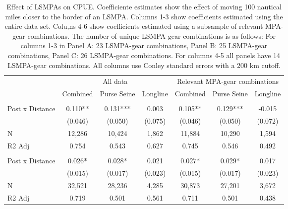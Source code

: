 \begin{table}

\caption{\label{tab:cont_treat}Effect of LSMPAs on CPUE. Coefficiente estimates show the
             effect of moving 100 nautical miles closer to the border of an LSMPA.
             Columns 1-3 show coefficients estimated using the entire data set.
             Colu,ns 4-6 show coefficients estimated using a subsample of relevant
             MPA-gear combinations. The number of unique LSMPA-gear combinations
             is as follows: For columns 1-3 in Panel A: 23 LSMPA-gear combinations,
             Panel B: 25 LSMPA-gear combinations, Panel C: 26 LSMPA-gear combinations.
             For columns 4-5 all panels have 14 LSMPA-gear combinations. All
             columns use Conley standard errors with a 200 km cutoff.}
\centering
\begin{tabular}[t]{lcccccc}
\toprule
\multicolumn{1}{c}{ } & \multicolumn{3}{c}{All data} & \multicolumn{3}{c}{Relevant MPA-gear combinations} \\
\cmidrule(l{3pt}r{3pt}){2-4} \cmidrule(l{3pt}r{3pt}){5-7}
 & Combined & Purse Seine & Longline & Combined & Purse Seine & Longline\\
\midrule
\addlinespace[0.3em]
\multicolumn{7}{l}{Panel A: 0-200 nautical miles}\\
\hline
\hspace{1em}Post x Distance & 0.110** & 0.131*** & 0.003 & 0.105** & 0.129*** & -0.015\\
\hspace{1em} & (0.046) & (0.050) & (0.075) & (0.046) & (0.050) & (0.072)\\
\hspace{1em}N & 12,286 & 10,424 & 1,862 & 11,884 & 10,290 & 1,594\\
\hspace{1em}R2 Adj & 0.754 & 0.543 & 0.627 & 0.745 & 0.546 & 0.492\\
\addlinespace[0.5cm]
\multicolumn{7}{l}{Panel B: 0-400 nautical miles}\\
\hline
\hspace{1em}Post x Distance & 0.026* & 0.028* & 0.021 & 0.027* & 0.029* & 0.017\\
\hspace{1em} & (0.015) & (0.017) & (0.023) & (0.015) & (0.017) & (0.023)\\
\hspace{1em}N & 32,521 & 28,236 & 4,285 & 30,873 & 27,201 & 3,672\\
\hspace{1em}R2 Adj & 0.719 & 0.501 & 0.561 & 0.711 & 0.501 & 0.438\\

\end{tabular}
\end{table}
